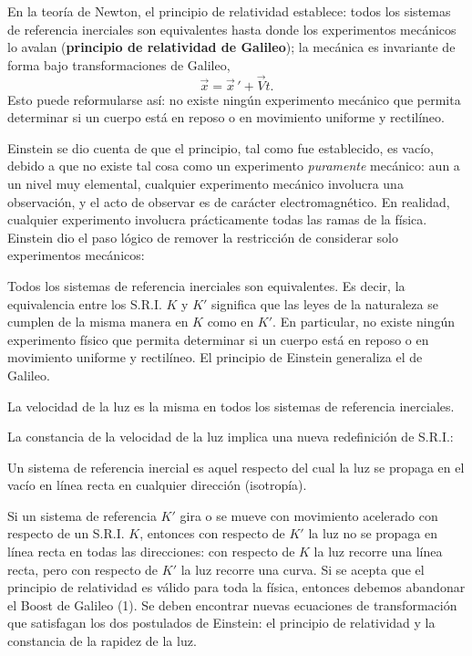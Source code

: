 En la teoría de Newton, el principio de relatividad establece: todos
los sistemas de referencia inerciales son equivalentes hasta donde los
experimentos mecánicos lo avalan (\textbf{principio de relatividad de
Galileo}); la mecánica es invariante de forma bajo transformaciones de
Galileo,
\[
\vec x = \vec x\,' + \vec V t . \tag{1}
\]
Esto puede reformularse así: no existe ningún experimento
mecánico que permita determinar si un cuerpo está en reposo o en
movimiento uniforme y rectilíneo.

Einstein se dio cuenta de que el principio, tal como fue establecido,
es vacío, debido a que no existe tal cosa como un experimento
\emph{puramente} mecánico: aun a un nivel muy elemental, cualquier
experimento mecánico involucra una observación, y el acto de observar
es de carácter electromagnético. En realidad, cualquier experimento
involucra prácticamente todas las ramas de la física. Einstein dio el
paso lógico de remover la restricción de considerar solo experimentos
mecánicos:

\begin{definicion}
Todos los sistemas de referencia inerciales son equivalentes. Es decir,
la equivalencia entre los S.R.I. $K$ y $K'$ significa que las leyes de
la naturaleza se cumplen de la misma manera en $K$ como en $K'$. En
particular, no existe ningún experimento físico que permita determinar si
un cuerpo está en reposo o en movimiento uniforme y rectilíneo. El
principio de Einstein generaliza el de Galileo.
\end{definicion}

\begin{definicion}
La velocidad de la luz es la misma en todos los sistemas de referencia
inerciales.
\end{definicion}

La constancia de la velocidad de la luz implica una nueva redefinición
de S.R.I.:

\begin{definicion}
Un sistema de referencia inercial es aquel respecto del cual la luz se
propaga en el vacío en línea recta en cualquier dirección
(isotropía).
\end{definicion}

Si un sistema de referencia $K'$ gira o se mueve con movimiento
acelerado con respecto de un S.R.I. $K$, entonces con respecto de $K'$
la luz no se propaga en línea recta en todas las direcciones: con
respecto de $K$ la luz recorre una línea recta, pero con respecto de
$K'$ la luz recorre una curva. Si se acepta que el principio de
relatividad es válido para toda la física, entonces debemos abandonar
el Boost de Galileo (1). Se deben encontrar nuevas ecuaciones de
transformación que satisfagan los dos postulados de Einstein: el
principio de relatividad y la constancia de la rapidez de la luz.


